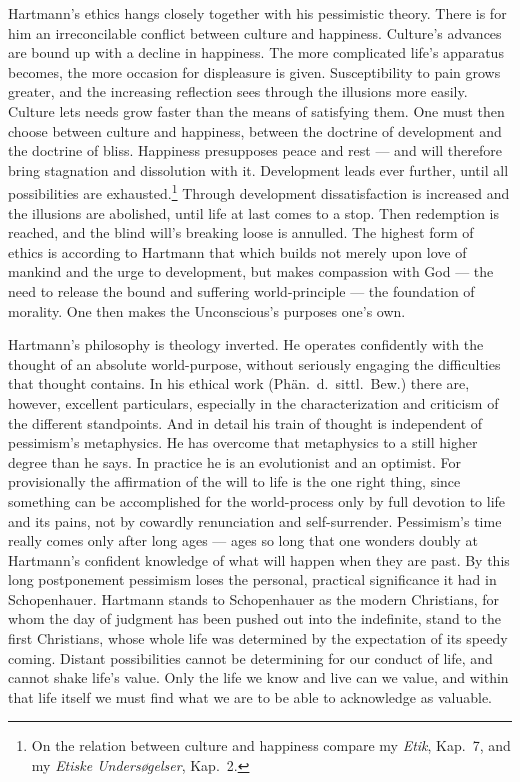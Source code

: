 \documentclass[12pt,a4paper]{book}
\newcommand{\opage}[1]{\marginnote{\footnotesize\textit{[#1]}}}
\begin{document}
Hartmann's ethics hangs closely together with his pessimistic theory. There is
for him an irreconcilable conflict between culture and happiness. Culture's
advances are bound up with a decline in happiness. The more complicated life's
apparatus becomes, the more occasion for displeasure is given. Susceptibility to
pain grows greater, and the increasing reflection sees through the illusions more
easily. Culture lets needs grow faster than the means of satisfying them. One
must then choose between culture and happiness, between the doctrine of
development and the doctrine of bliss. Happiness presupposes peace and rest ---
and will therefore bring stagnation and dissolution with it. Development leads
ever further, until all possibilities are
exhausted.\footnote{On the relation between culture and happiness compare my
\textit{Etik}, Kap.~7, and my \textit{Etiske Undersøgelser}, Kap.~2.} Through
development dissatisfaction is increased and the illusions are abolished, until
life at last comes to a stop. Then redemption is reached, and the blind will's
breaking loose is annulled. The highest form of ethics is according to Hartmann
that which builds not merely upon love of mankind and the urge to development,
but makes compassion with God --- the need to release the bound and suffering
world-principle --- the foundation of morality. One then makes the Unconscious's
purposes one's own.

Hartmann's philosophy is theology inverted. He operates confidently with the
thought of an absolute world-purpose, without seriously engaging the difficulties
that thought contains. In \opage{543}his ethical work (Phän.\ d.\ sittl.\ Bew.) there are,
however, excellent particulars, especially in the characterization and criticism
of the different standpoints. And in detail his train of thought is independent
of pessimism's metaphysics. He has overcome that metaphysics to a still higher
degree than he says. In practice he is an evolutionist and an optimist. For
provisionally the affirmation of the will to life is the one right thing, since
something can be accomplished for the world-process only by full devotion to life
and its pains, not by cowardly renunciation and self-surrender. Pessimism's time
really comes only after long ages --- ages so long that one wonders doubly at
Hartmann's confident knowledge of what will happen when they are past. By this
long postponement pessimism loses the personal, practical significance it had in
Schopenhauer. Hartmann stands to Schopenhauer as the modern Christians, for whom
the day of judgment has been pushed out into the indefinite, stand to the first
Christians, whose whole life was determined by the expectation of its speedy
coming. Distant possibilities cannot be determining for our conduct of life, and
cannot shake life's value. Only the life we know and live can we value, and
within that life itself we must find what we are to be able to acknowledge as
valuable.
\end{document}

